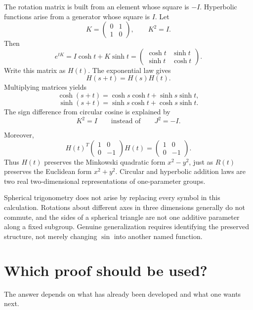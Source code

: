 The rotation matrix is built from an element whose square is \(-I\).  Hyperbolic functions arise from a generator whose square is \(I\).  Let
\[
  K=
  \begin{pmatrix}
    0&1\\
    1&0
  \end{pmatrix},
  \qquad
  K^2=I.
\]
Then
\[
  e^{tK}
  =I\cosh t+K\sinh t
  =
  \begin{pmatrix}
    \cosh t&\sinh t\\
    \sinh t&\cosh t
  \end{pmatrix}.
\]
Write this matrix as \(H(t)\).  The exponential law gives
\[
  H(s+t)=H(s)H(t).
\]
Multiplying matrices yields
\[
  \boxed{
  \cosh(s+t)
  =\cosh s\cosh t+\sinh s\sinh t,}
\]
\[
  \boxed{
  \sinh(s+t)
  =\sinh s\cosh t+\cosh s\sinh t.}
\]
The sign difference from circular cosine is explained by
\[
  K^2=I
  \qquad\text{instead of}\qquad
  J^2=-I.
\]

Moreover,
\[
  H(t)^T
  \begin{pmatrix}1&0\\0&-1\end{pmatrix}
  H(t)
  =
  \begin{pmatrix}1&0\\0&-1\end{pmatrix}.
\]
Thus \(H(t)\) preserves the Minkowski quadratic form \(x^2-y^2\), just as \(R(t)\) preserves the Euclidean form \(x^2+y^2\).  Circular and hyperbolic addition laws are two real two-dimensional representations of one-parameter groups.

Spherical trigonometry does not arise by replacing every symbol in this calculation.  Rotations about different axes in three dimensions generally do not commute, and the sides of a spherical triangle are not one additive parameter along a fixed subgroup.  Genuine generalization requires identifying the preserved structure, not merely changing \(\sin\) into another named function.

\section{Which proof should be used?}

The answer depends on what has already been developed and what one wants next.

